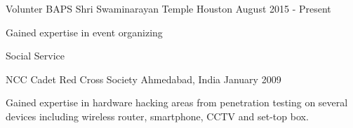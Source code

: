 \begin{cventries}
	\cventry
	{Volunter} %
	{BAPS Shri Swaminarayan Temple} %
	{Houston} %
	{August 2015 - Present} %
	{ %
		\begin{cvitems}
			\item {Gained expertise in event organizing}
			\item {Social Service}
		\end{cvitems}
	}
\end{cventries}
\begin{cventries}
	\cventry
	{NCC Cadet} %
	{Red Cross Society} %
	{Ahmedabad, India} %
	{January 2009} %
	{ %
		\begin{cvitems}
			\item {Gained expertise in hardware hacking areas from penetration testing on several devices including wireless router, smartphone, CCTV and set-top box.}
		\end{cvitems}
	}
\end{cventries}